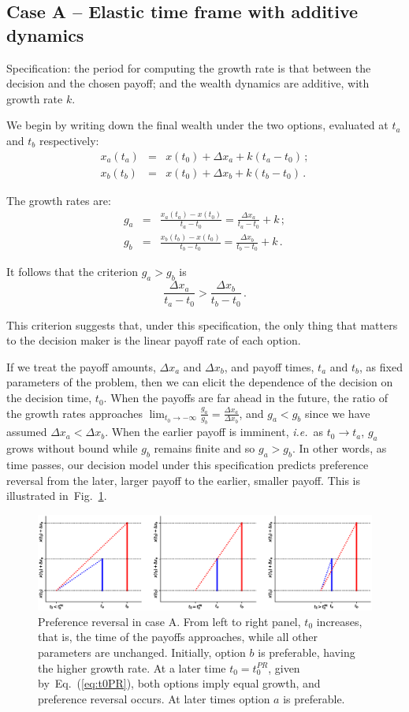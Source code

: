\documentclass[11pt]{article}
\newcommand{\eref}[1]{Eq.~(\ref{eq:#1})}
\newcommand{\ie}{{\it i.e.}\ }
\newcommand{\flabel}[1]{\label{fig:#1}}
\newcommand{\fref}[1]{Fig.~\ref{fig:#1}}
\newcommand{\be}{\begin{equation}}
\newcommand{\ee}{\end{equation}}
\newcommand{\bea}{\begin{eqnarray}}
\newcommand{\eea}{\end{eqnarray}}
\newcommand{\Dx}{\Delta x}
\numberwithin{equation}{section}
\begin{document}
\subsection{Case A -- Elastic time frame with additive dynamics}\label{sec:case_A}

Specification: the period for computing the growth rate is that between the decision and the chosen payoff; and the wealth dynamics are additive, with growth rate $k$.

We begin by writing down the final wealth under the two options, evaluated at $t_a$ and $t_b$ respectively:
\bea
x_a\left(t_a\right) &=& x\left(t_0\right) + \Dx_a + k(t_a-t_0)\,;\\
x_b\left(t_b\right) &=& x\left(t_0\right) + \Dx_b + k(t_b-t_0)\,.
\eea

The growth rates are:
\bea
g_a &=& \frac{x_a\left(t_a\right) - x\left(t_0\right)}{t_a-t_0} = \frac{\Dx_a}{t_a-t_0} + k\,;\\
g_b &=& \frac{x_b\left(t_b\right) - x\left(t_0\right)}{t_b-t_0} = \frac{\Dx_b}{t_b-t_0} + k\,.
\eea

It follows that the criterion $g_a > g_b$ is
\be
\frac{\Dx_a}{t_a-t_0} > \frac{\Dx_b}{t_b-t_0}\,.
\ee

This criterion suggests that, under this specification, the only thing that matters to the decision maker is the linear payoff rate of each option.

If we treat the payoff amounts, $\Dx_a$ and $\Dx_b$, and payoff times, $t_a$ and $t_b$, as fixed parameters of the problem, then we can elicit the dependence of the decision on the decision time, $t_0$. When the payoffs are far ahead in the future, the ratio of the growth rates approaches $\lim_{t_0\to-\infty}\frac{g_a}{g_b}=\frac{\Dx_a}{\Dx_b}$, and $g_a<g_b$ since we have assumed $\Dx_a<\Dx_b$. When the earlier payoff is imminent, \ie as $t_0\to t_a$, $g_a$ grows without bound while $g_b$ remains finite and so $g_a>g_b$. In other words, as time passes, our decision model under this specification predicts preference reversal from the later, larger payoff to the earlier, smaller payoff. This is illustrated in~\fref{caseA}.

\begin{figure}[!htb]
\centering
\includegraphics[width=1.0\textwidth]{./figures/reversals.eps}
\caption{Preference reversal in case A. From left to right panel, $t_0$ increases, that is, the time of the payoffs approaches, while all other parameters are unchanged. Initially, option $b$ is preferable, having the higher growth rate. At a later time $t_0=t_0^{PR}$, given by~\eref{t0PR}, both options imply equal growth, and preference reversal occurs. At later times option $a$ is preferable.}
\flabel{caseA}
\end{figure}
\end{document}
